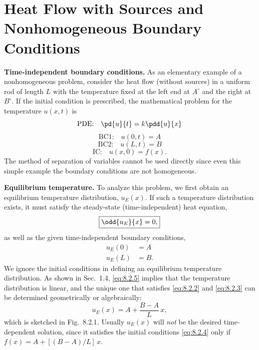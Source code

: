 \section{Heat Flow with Sources and Nonhomogeneous Boundary Conditions}
\label{sec:heat-nonhomog-bc}

\textbf{Time-independent boundary conditions.}
As an elementary example of a nonhomogeneous problem, consider the heat flow (without sources) in a uniform rod of length $L$ with the temperature fixed at the left end at $A^\circ$ and the right at $B^\circ$.  If the initial condition is prescribed, the mathematical problem for the temperature $u(x,t)$ is
\begin{equation}
\label{eq:8.2.1}
\text{PDE:}\quad \pd{u}{t} = k\pdd{u}{x}
\end{equation}
\begin{equation}
\label{eq:8.2.2}
\text{BC1:}\quad u(0,t) = A
\end{equation}
\begin{equation}
\label{eq:8.2.3}
\text{BC2:}\quad u(L,t) = B
\end{equation}
\begin{equation}
\label{eq:8.2.4}
\text{IC:}\quad u(x,0) = f(x).
\end{equation}
The method of separation of variables cannot be used directly since even this simple example the boundary conditions are not homogeneous.

\textbf{Equilibrium temperature.}
To analyze this problem, we first obtain an equilibrium temperature distribution, $u_E(x)$.  If such a temperature distribution exists, it must satisfy the steady-state (time-independent) heat equation,
\begin{equation}
\label{eq:8.2.5}
\boxed{\odd{u_E}{x} = 0,}
\end{equation}
as well as the given time-independent boundary conditions,
\begin{align}
\label{eq:8.2.6}
u_E(0) &= A \\
\label{eq:8.2.7}
u_E(L) &= B.
\end{align}
We ignore the initial conditions in defining an equilibrium temperature distribution.  As shown in Sec.~1.4, \eqref{eq:8.2.5} implies that the temperature distribution is linear, and the unique one that satisfies \eqref{eq:8.2.2} and \eqref{eq:8.2.3} can be determined geometrically or algebraically:
\begin{equation}
\label{eq:8.2.8}
\boxed{u_E(x) = A + \frac{B-A}{L}\,x,}
\end{equation}
which is sketched in Fig.~8.2.1.  Usually $u_E(x)$ will \emph{not} be the desired time-dependent solution, since it satisfies the initial conditions \eqref{eq:8.2.4} only if $f(x) = A + [(B-A)/L]\,x$.

